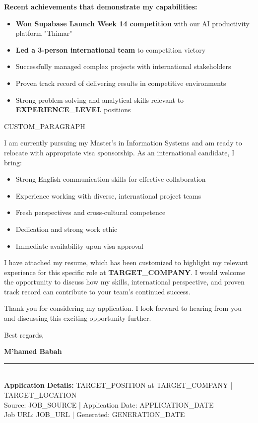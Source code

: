 \documentclass[11pt,a4paper]{letter}
\newcommand{\highlight}[1]{\textcolor{primarycolor}{\textbf{#1}}}
\begin{document}
\textbf{Recent achievements that demonstrate my capabilities:}
\begin{itemize}
\item \highlight{Won Supabase Launch Week 14 competition} with our AI productivity platform "Thimar"
\item \highlight{Led a 3-person international team} to competition victory
\item Successfully managed complex projects with international stakeholders
\item Proven track record of delivering results in competitive environments
\item Strong problem-solving and analytical skills relevant to \textbf{{EXPERIENCE_LEVEL}} positions
\end{itemize}

{CUSTOM_PARAGRAPH}

I am currently pursuing my Master's in Information Systems and am ready to relocate with appropriate visa sponsorship. As an international candidate, I bring:

\begin{itemize}
\item Strong English communication skills for effective collaboration
\item Experience working with diverse, international project teams
\item Fresh perspectives and cross-cultural competence
\item Dedication and strong work ethic
\item Immediate availability upon visa approval
\end{itemize}

I have attached my resume, which has been customized to highlight my relevant experience for this specific role at \highlight{{TARGET_COMPANY}}. I would welcome the opportunity to discuss how my skills, international perspective, and proven track record can contribute to your team's continued success.

Thank you for considering my application. I look forward to hearing from you and discussing this exciting opportunity further.

\vspace{0.5cm}

Best regards,

\vspace{0.8cm}

\textbf{M'hamed Babah}

\vspace{1cm}

\begin{center}
\footnotesize
\textcolor{secondarycolor}{
\rule{\textwidth}{0.5pt} \\
\textbf{Application Details:} {TARGET_POSITION} at {TARGET_COMPANY} | {TARGET_LOCATION} \\
Source: {JOB_SOURCE} | Application Date: {APPLICATION_DATE} \\
Job URL: {JOB_URL} | Generated: {GENERATION_DATE}
}
\end{center}
\end{document}
